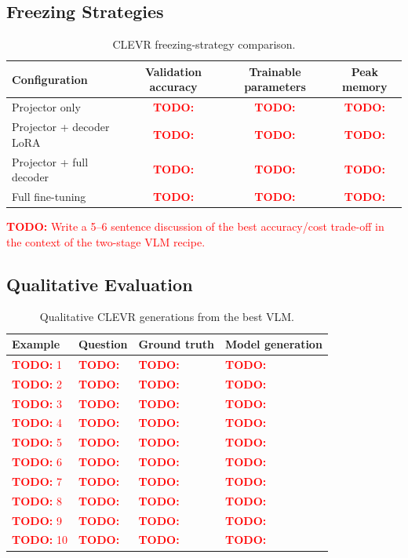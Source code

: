 \documentclass[11pt]{article}
\newcommand{\TODO}[1]{\textcolor{red}{\textbf{TODO:} #1}}
\begin{document}
\subsection{Freezing Strategies}

\begin{table}[H]
    \centering
    \begin{tabular}{lccc}
        \toprule
        Configuration & Validation accuracy & Trainable parameters & Peak memory \\
        \midrule
        Projector only & \TODO{} & \TODO{} & \TODO{} \\
        Projector + decoder LoRA & \TODO{} & \TODO{} & \TODO{} \\
        Projector + full decoder & \TODO{} & \TODO{} & \TODO{} \\
        Full fine-tuning & \TODO{} & \TODO{} & \TODO{} \\
        \bottomrule
    \end{tabular}
    \caption{CLEVR freezing-strategy comparison.}
    \label{tab:vlm-freezing}
\end{table}

\TODO{Write a 5--6 sentence discussion of the best accuracy/cost trade-off in the context of the two-stage VLM recipe.}

\subsection{Qualitative Evaluation}

\begin{table}[H]
    \centering
    \begin{tabular}{llll}
        \toprule
        Example & Question & Ground truth & Model generation \\
        \midrule
        \TODO{1} & \TODO{} & \TODO{} & \TODO{} \\
        \TODO{2} & \TODO{} & \TODO{} & \TODO{} \\
        \TODO{3} & \TODO{} & \TODO{} & \TODO{} \\
        \TODO{4} & \TODO{} & \TODO{} & \TODO{} \\
        \TODO{5} & \TODO{} & \TODO{} & \TODO{} \\
        \TODO{6} & \TODO{} & \TODO{} & \TODO{} \\
        \TODO{7} & \TODO{} & \TODO{} & \TODO{} \\
        \TODO{8} & \TODO{} & \TODO{} & \TODO{} \\
        \TODO{9} & \TODO{} & \TODO{} & \TODO{} \\
        \TODO{10} & \TODO{} & \TODO{} & \TODO{} \\
        \bottomrule
    \end{tabular}
    \caption{Qualitative CLEVR generations from the best VLM.}
    \label{tab:vlm-qualitative}
\end{table}
\end{document}
